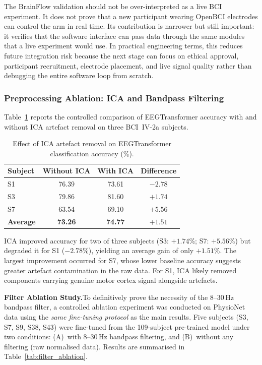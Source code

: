 \documentclass[12pt, a4paper]{article}
\begin{document}
The BrainFlow validation should not be over-interpreted as a live BCI experiment. It does not prove that a new participant wearing OpenBCI electrodes can control the arm in real time. Its contribution is narrower but still important: it verifies that the software interface can pass data through the same modules that a live experiment would use. In practical engineering terms, this reduces future integration risk because the next stage can focus on ethical approval, participant recruitment, electrode placement, and live signal quality rather than debugging the entire software loop from scratch.

\subsubsection{Preprocessing Ablation: ICA and Bandpass Filtering}
\label{sec:ica_results}
\label{sec:res_preproc}

Table~\ref{tab:ica_comparison} reports the controlled comparison of EEGTransformer accuracy with and without ICA artefact removal on three BCI~IV-2a subjects.

\begin{table}[htbp]
\centering
\caption{Effect of ICA artefact removal on EEGTransformer classification accuracy (\%).}
\label{tab:ica_comparison}
\begin{tabular}{lccc}
\toprule
\textbf{Subject} & \textbf{Without ICA} & \textbf{With ICA} & \textbf{Difference} \\
\midrule
S1 & 76.39 & 73.61 & $-2.78$ \\
S3 & 79.86 & 81.60 & $+1.74$ \\
S7 & 63.54 & 69.10 & $+5.56$ \\
\midrule
\textbf{Average} & \textbf{73.26} & \textbf{74.77} & $\mathbf{+1.51}$ \\
\bottomrule
\end{tabular}
\end{table}

ICA improved accuracy for two of three subjects (S3: $+1.74\%$; S7: $+5.56\%$) but degraded it for S1 ($-2.78\%$), yielding an average gain of only $+1.51\%$. The largest improvement occurred for S7, whose lower baseline accuracy suggests greater artefact contamination in the raw data. For S1, ICA likely removed components carrying genuine motor cortex signal alongside artefacts.

\textbf{Filter Ablation Study.}\quad To definitively prove the necessity of the 8--30\,Hz bandpass filter, a controlled ablation experiment was conducted on PhysioNet data using the \emph{same fine-tuning protocol} as the main results. Five subjects (S3, S7, S9, S38, S43) were fine-tuned from the 109-subject pre-trained model under two conditions: (A)~with 8--30\,Hz bandpass filtering, and (B)~without any filtering (raw normalised data). Results are summarised in Table~\ref{tab:filter_ablation}.
\end{document}
